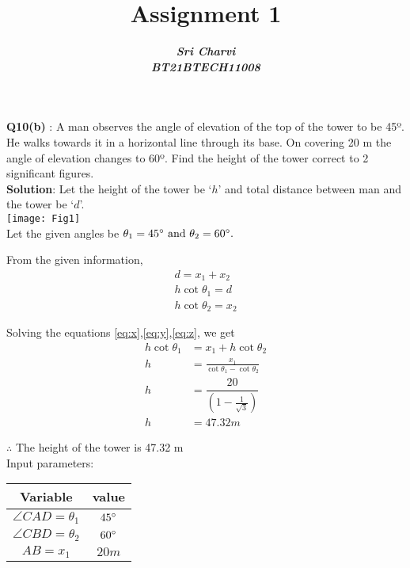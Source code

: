 \documentclass[journal,12pt,twocolumn]{IEEEtran}
\title{ Assignment 1}
\author{\textbf{\textit{Sri Charvi}}\\
\textbf{\textit{BT21BTECH11008}}}
\begin{document}
\maketitle
\textbf{Q10(b) }: A man observes the angle of elevation of the top of the tower to be 45º.
 He walks towards it in a horizontal line through its base. On covering 20 m the angle of 
elevation changes to 60º. Find the height of the tower correct to 2 significant figures.\\

\medskip
\textbf{Solution}: Let the height of the tower be `$h$' and total distance between man and the tower be `$d$'.\\

\texttt{[image: Fig1]}\\
 Let the given angles
be $\theta_1=45\degree \text{ and } \theta_2=60\degree.$

From the given information,
\begin{align}
\label{eq:x}
d=x_1+x_2\\
\label{eq:y}
h\cot\theta_1=d\\
\label{eq:z}
h\cot\theta_2=x_2 
\end{align}

Solving the equations \eqref{eq:x},\eqref{eq:y},\eqref{eq:z}, we get
\begin{align*}
 h\cot\theta_1&=x_1+h\cot\theta_2\\
 h&=\frac{x_1}{\cot\theta_1-\cot\theta_2}\\
 h&=\dfrac{20}{\left(1-\frac{1}{\sqrt{3}}\right)}\\
 h &= 47.32m
\end{align*}

$\therefore $ The height of the tower is 47.32 m\\


Input parameters:\\

\begin{tabular}{|c|c|}

\hline
\textbf{Variable} & \textbf{value}\\
 \hline
$\angle CAD = \theta_1$ & $45\degree$\\
 \hline
$\angle CBD = \theta_2$ & $60\degree$\\
 \hline
$AB = x_1$ & $20m$\\ 
 \hline






\end{tabular}
\end{document}
